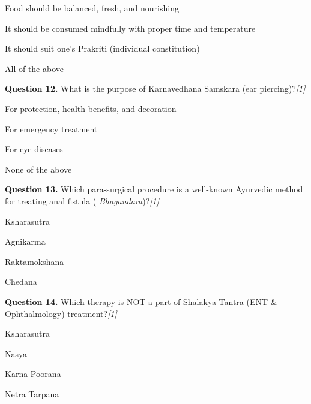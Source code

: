 \documentclass[11pt,a4paper]{article}
\newcommand{\pts}[1]{\hfill   \textit{[#1]}}
\begin{document}
\begin{parts}
  \item Food should be balanced, fresh, and nourishing
  \item It should be consumed mindfully with proper time and temperature
  \item It should suit one's Prakriti (individual constitution)
  \item All of the above
\end{parts}

\medskip




\noindent   \textbf{Question 12.} What is the purpose of Karnavedhana Samskara (ear piercing)?\pts{1}

\begin{parts}
  \item For protection, health benefits, and decoration
  \item For emergency treatment
  \item For eye diseases
  \item None of the above
\end{parts}

\medskip




\noindent   \textbf{Question 13.} Which para-surgical procedure is a well-known Ayurvedic method for treating anal fistula (   \textit{Bhagandara})?\pts{1}

\begin{parts}
  \item Ksharasutra
  \item Agnikarma
  \item Raktamokshana
  \item Chedana
\end{parts}

\medskip




\noindent   \textbf{Question 14.} Which therapy is NOT a part of Shalakya Tantra (ENT \& Ophthalmology) treatment?\pts{1}

\begin{parts}
  \item Ksharasutra
  \item Nasya
  \item Karna Poorana
  \item Netra Tarpana
\end{parts}

\medskip
\end{document}
